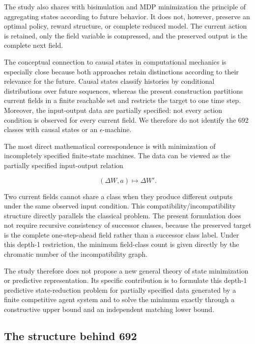 \documentclass[
  11pt,
]{article}
\begin{document}
The study also shares with bisimulation and MDP minimization the
principle of aggregating states according to future behavior. It does
not, however, preserve an optimal policy, reward structure, or complete
reduced model. The current action is retained, only the field variable
is compressed, and the preserved output is the complete next field.

The conceptual connection to causal states in computational mechanics is
especially close because both approaches retain distinctions according
to their relevance for the future. Causal states classify histories by
conditional distributions over future sequences, whereas the present
construction partitions current fields in a finite reachable set and
restricts the target to one time step. Moreover, the input-output data
are partially specified: not every action condition is observed for
every current field. We therefore do not identify the 692 classes with
causal states or an \({\epsilon}\)-machine.

The most direct mathematical correspondence is with minimization of
incompletely specified finite-state machines. The data can be viewed as
the partially specified input-output relation

\[{(\Delta W,a)\longmapsto\Delta W'.}\]

Two current fields cannot share a class when they produce different
outputs under the same observed input condition. This
compatibility/incompatibility structure directly parallels the classical
problem. The present formulation does not require recursive consistency
of successor classes, because the preserved target is the complete
one-step-ahead field rather than a successor class label. Under this
depth-1 restriction, the minimum field-class count is given directly by
the chromatic number of the incompatibility graph.

The study therefore does not propose a new general theory of state
minimization or predictive representation. Its specific contribution is
to formulate this depth-1 predictive state-reduction problem for
partially specified data generated by a finite competitive agent system
and to solve the minimum exactly through a constructive upper bound and
an independent matching lower bound.

\hypertarget{the-structure-behind-692}{%
\subsection{The structure behind 692}\label{the-structure-behind-692}}
\end{document}
